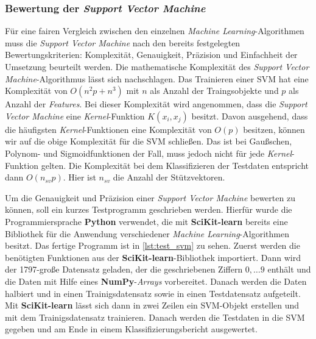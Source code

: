 \subsubsection{Bewertung der \textit{Support Vector Machine}}
Für eine fairen Vergleich zwischen den einzelnen \textit{Machine Learning}-Algorithmen muss die \textit{Support Vector Machine}
nach den bereits festgelegten Bewertungskriterien: Komplexität, Genauigkeit, Präzision und Einfachheit der Umsetzung beurteilt werden.
Die mathematische Komplexität des \textit{Support Vector Machine}-Algorithmus lässt sich nachschlagen.
Das Trainieren einer SVM hat eine Komplexität von $O(n^2 p + n^3)$ mit $n$ als Anzahl der Traingsobjekte und $p$ als Anzahl der \textit{Features}.
Bei dieser Komplexität wird angenommen, dass die \textit{Support Vector Machine} eine \textit{Kernel}-Funktion $K(x_i, x_j)$ besitzt.
Davon ausgehend, dass die häufigsten \textit{Kernel}-Funktionen eine Komplexität von $O(p)$ besitzen, können wir auf die obige Komplexität
für die SVM schließen. Das ist bei Gaußschen, Polynom- und Sigmoidfunktionen der Fall, muss jedoch nicht für jede \textit{Kernel}-Funktion gelten.
Die Komplexität bei dem Klassifizieren der Testdaten entspricht dann $O(n_{sv} p)$. Hier ist $n_{sv}$ die Anzahl der Stützvektoren.\cite{complexity}

Um die Genauigkeit und Präzision einer \textit{Support Vector Machine} bewerten zu können, soll ein kurzes Testprogramm geschrieben werden.
Hierfür wurde die Programmiersprache \textbf{Python} verwendet, die mit \textbf{SciKit-learn} bereits eine Bibliothek für die Anwendung 
verschiedener \textit{Machine Learning}-Algorithmen besitzt. Das fertige Programm ist in \ref{lst:test_svm} zu sehen.
Zuerst werden die benötigten Funktionen aus der \textbf{SciKit-learn}-Bibliothek importiert. Dann wird der 1797-große Datensatz geladen, der die
geschriebenen Ziffern $0, \dots 9$ enthält und die Daten mit Hilfe eines \textbf{NumPy}-\textit{Arrays} vorbereitet. Danach werden die Daten halbiert und in einen
Trainigsdatensatz sowie in einen Testdatensatz aufgeteilt. Mit \textbf{SciKit-learn} lässt sich dann in zwei Zeilen ein SVM-Objekt erstellen und
mit dem Trainigsdatensatz trainieren. Danach werden die Testdaten in die SVM gegeben und am Ende in einem Klassifizierungsbericht ausgewertet.

